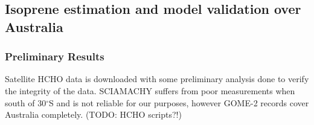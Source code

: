 \subsection{Isoprene estimation and model validation over Australia}

\subsubsection{Preliminary Results}

Satellite HCHO data is downloaded with some preliminary analysis done to verify the integrity of the data.
SCIAMACHY suffers from poor measurements when south of 30$^{\circ}$S and is not reliable for our purposes, however GOME-2 records cover Australia completely. 
(TODO: HCHO scripts?!)

